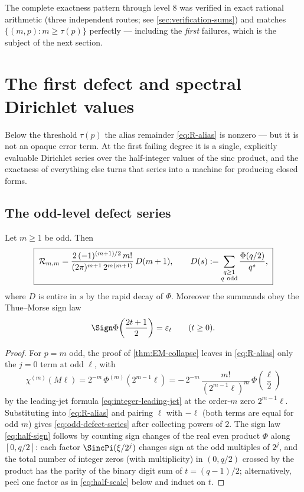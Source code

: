 The complete exactness pattern through level $8$ was verified in exact
rational arithmetic (three independent routes; see
\cref{sec:verification-sums}) and matches
$\{(m,p):m\ge\tau(p)\}$ perfectly --- including the \emph{first}
failures, which is the subject of the next section.

\section{The first defect and spectral Dirichlet values}
\label{sec:dirichlet}

Below the threshold $\tau(p)$ the alias remainder \eqref{eq:R-alias}
is nonzero --- but it is not an opaque error term.  At the first
failing degree it is a single, explicitly evaluable Dirichlet series
over the half-integer values of the sinc product, and the exactness of
everything else turns that series into a machine for producing closed
forms.

\subsection{The odd-level defect series}

\begin{theorem}
\label{thm:odd-defect}
Let $m\ge1$ be odd.  Then
\begin{equation}
 \boxed{\;
 \mathcal R_{m,m}
 =\frac{2\,(-1)^{(m+1)/2}\,m!}
 {(2\pi)^{m+1}\,2^{m(m+1)}}\,
 D(m+1),
 \qquad
 D(s):=\sum_{\substack{q\ge1\\ q\ \mathrm{odd}}}
 \frac{\Phi(q/2)}{q^{s}},
 \;}
 \label{eq:odd-defect-series}
\end{equation}
where $D$ is entire in $s$ by the rapid decay of $\Phi$.  Moreover the
summands obey the Thue--Morse sign law
\begin{equation}
 \Sign\Phi\!\left(\frac{2t+1}{2}\right)=\eps_t
 \qquad(t\ge0).
 \label{eq:half-sign}
\end{equation}
\end{theorem}

\begin{proof}
For $p=m$ odd, the proof of \cref{thm:EM-collapse} leaves in
\eqref{eq:R-alias} only the $j=0$ term at odd $\ell$, with
\[
 \chi^{(m)}(M\ell)
 =2^{-m}\,\Phi^{(m)}\!\left(2^{m-1}\ell\right)
 =-\,2^{-m}\,\frac{m!}{(2^{m-1}\ell)^{m}}\,
 \Phi\!\left(\frac{\ell}{2}\right)
\]
by the leading-jet formula \eqref{eq:integer-leading-jet} at the
order-$m$ zero $2^{m-1}\ell$.  Substituting into \eqref{eq:R-alias}
and pairing $\ell$ with $-\ell$ (both terms are equal for odd $m$)
gives \eqref{eq:odd-defect-series} after collecting powers of $2$.
The sign law \eqref{eq:half-sign} follows by counting sign changes of
the real even product $\Phi$ along $[0,q/2]$: each factor
$\SincPi(\xi/2^{j})$ changes sign at the odd multiples of $2^{j}$, and
the total number of integer zeros (with multiplicity) in $(0,q/2)$
crossed by the product has the parity of the binary digit sum of
$t=(q-1)/2$; alternatively, peel one factor as in
\eqref{eq:half-scale} below and induct on $t$.
\end{proof}

